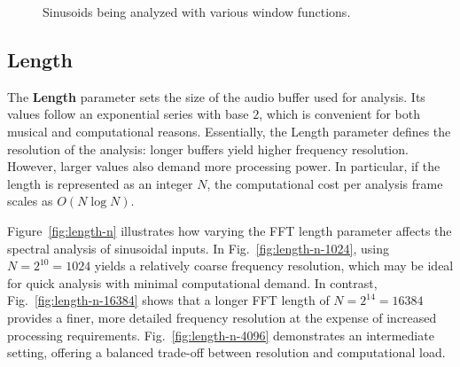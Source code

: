 \documentclass[12pt,letter]{article}
\begin{document}
\begin{figure}[!htp]
\centering
{}
\hfill
{}
\hfill
{}
\caption{Sinusoids being analyzed with various window functions.}
\label{fig:window-function-sinusoids}
\end{figure}

\subsection{Length}

The \textbf{Length} parameter sets the size of the audio buffer used for
analysis. Its values follow an exponential series with base $2$, which is
convenient for both musical and computational reasons. Essentially, the
Length parameter defines the resolution of the analysis: longer buffers yield
higher frequency resolution. However, larger values also demand more
processing power. In particular, if the length is represented as an integer
$N$, the computational cost per analysis frame scales as $O(N \log N)$.

Figure~\ref{fig:length-n} illustrates how varying the FFT length parameter
affects the spectral analysis of sinusoidal inputs. In
Fig.~\ref{fig:length-n-1024}, using $N = 2^{10} = 1024$ yields a relatively
coarse frequency resolution, which may be ideal for quick analysis with
minimal computational demand. In contrast, Fig.~\ref{fig:length-n-16384}
shows that a longer FFT length of $N = 2^{14} = 16384$ provides a finer, more
detailed frequency resolution at the expense of increased processing
requirements. Fig.~\ref{fig:length-n-4096} demonstrates an intermediate
setting, offering a balanced trade-off between resolution and computational
load.
\end{document}
